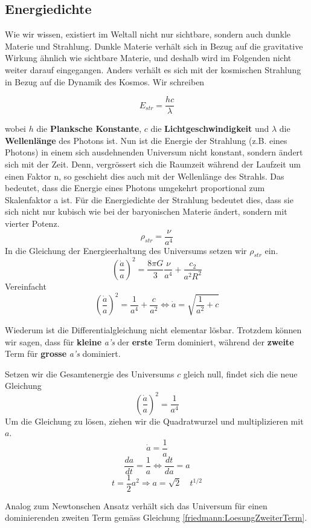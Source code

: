 \begin{refsection}
\subsection*{Energiedichte}
Wie wir wissen, existiert im Weltall nicht nur sichtbare, sondern auch dunkle Materie und Strahlung. Dunkle Materie verhält sich in Bezug auf die gravitative Wirkung ähnlich wie sichtbare Materie, und deshalb wird im Folgenden nicht weiter darauf eingegangen.
Anders verhält es sich mit der kosmischen Strahlung in Bezug auf die Dynamik des Kosmos. Wir schreiben


\[ E_{str} = \frac{h c}{\lambda} \]

wobei $h$ die \textbf{Planksche Konstante}, $c$ die \textbf{Lichtgeschwindigkeit} und $\lambda$ die \textbf{Wellenlänge} des Photons ist.
Nun ist die Energie der Strahlung (z.B. eines Photons) in einem sich ausdehnenden Universum nicht konstant, sondern ändert sich mit der Zeit. 
Denn, vergrössert sich die Raumzeit während der Laufzeit um einen Faktor n, so geschieht dies auch mit der Wellenlänge des Strahls.
Das bedeutet, dass die Energie eines Photons umgekehrt proportional zum Skalenfaktor a ist. Für die Energiedichte der Strahlung bedeutet dies, dass sie sich nicht nur kubisch wie bei der baryonischen Materie ändert, sondern mit vierter Potenz.
\begin{equation}
\rho_{str} = \frac{\nu}{a^4}
\end{equation}
In die Gleichung der Energieerhaltung des Universums setzen wir $\rho_{str}$ ein.
\[
\left(\frac{\dot{a}}{a} \right)^2 = \frac{8 \pi G}{3} \frac{\nu}{a^4} + \frac{c_2}{a^2 R^2}
\]
Vereinfacht
\[
\left(\frac{\dot{a}}{a} \right)^2 = \frac{1}{a^4} + \frac{c}{a^2} \Leftrightarrow \dot{a} = \sqrt{\frac{1}{a^2} + c}
\]

Wiederum ist die Differentialgleichung nicht elementar lösbar. Trotzdem können wir sagen, dass für \textbf{kleine} \textit{a's} der \textbf{erste} Term dominiert, während der \textbf{zweite} Term für \textbf{grosse} \textit{a's} dominiert.


Setzen wir die Gesamtenergie des Universums $c$ gleich null, findet sich die neue Gleichung	\[\left(\frac{\dot{a}}{a} \right)^2 = \frac{1}{a^4}\]
Um die Gleichung zu lösen, ziehen wir die Quadratwurzel und multiplizieren mit $a$.
\[ \dot{a} = \frac{1}{a} \]
\[\frac{da}{dt} =\frac{1}{a} \Leftrightarrow \frac{dt}{da} = a \]
\[ t = \frac{1}{2} a^{2} \Rightarrow a = \sqrt{2} \quad t^{1/2} \]

Analog zum Newtonschen Ansatz verhält sich das Universum für einen dominierenden zweiten Term gemäss Gleichung \ref{friedmann:LoesungZweiterTerm}.


\end{refsection}
